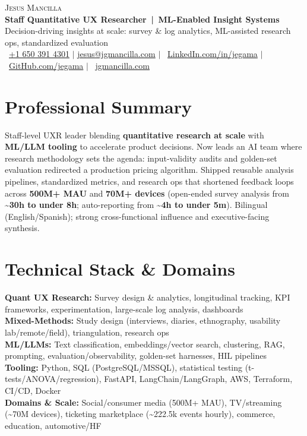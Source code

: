 \documentclass[letterpaper,10pt]{article}
\begin{document}
\begin{center}
  {\Huge\scshape Jesus Mancilla} \\[4pt]
  \textbf{Staff Quantitative UX Researcher \,|\, ML-Enabled Insight Systems} \\
  \small
  Decision-driving insights at scale: survey \& log analytics, ML-assisted research ops, standardized evaluation \\
  \faMobile\ \href{tel:16503914301}{+1 650 391 4301}  $|$
  \href{mailto:jesus@jgmancilla.com}{jesus@jgmancilla.com}  $|$
  \faLinkedinSquare\ \href{https://www.linkedin.com/in/jegama}{LinkedIn.com/in/jegama}  $|$
  \faGithub\ \href{https://github.com/jegama}{GitHub.com/jegama}  $|$
  \faGlobe\ \href{https://www.jgmancilla.com/}{jgmancilla.com}
\end{center}

\section{Professional Summary}
Staff-level UXR leader blending \textbf{quantitative research at scale} with \textbf{ML/LLM tooling} to accelerate product decisions. Now leads an AI team where research methodology sets the agenda: input-validity audits and golden-set evaluation redirected a production pricing algorithm. Shipped reusable analysis pipelines, standardized metrics, and research ops that shortened feedback loops across \textbf{500M+ MAU} and \textbf{70M+ devices} (open-ended survey analysis from \textbf{\textasciitilde30h to under 8h}; auto-reporting from \textbf{\textasciitilde4h to under 5m}). Bilingual (English/Spanish); strong cross-functional influence and executive-facing synthesis.

\section{Technical Stack \& Domains}
\small
\textbf{Quant UX Research:} Survey design \& analytics, longitudinal tracking, KPI frameworks, experimentation, large-scale log analysis, dashboards \\
\textbf{Mixed-Methods:} Study design (interviews, diaries, ethnography, usability lab/remote/field), triangulation, research ops \\
\textbf{ML/LLMs:} Text classification, embeddings/vector search, clustering, RAG, prompting, evaluation/observability, golden-set harnesses, HIL pipelines \\
\textbf{Tooling:} Python, SQL (PostgreSQL/MSSQL), statistical testing (t-tests/ANOVA/regression), FastAPI, LangChain/LangGraph, AWS, Terraform, CI/CD, Docker \\
\textbf{Domains \& Scale:} Social/consumer media (500M+ MAU), TV/streaming (\textasciitilde70M devices), ticketing marketplace (\textasciitilde222.5k events hourly), commerce, education, automotive/HF
\end{document}
